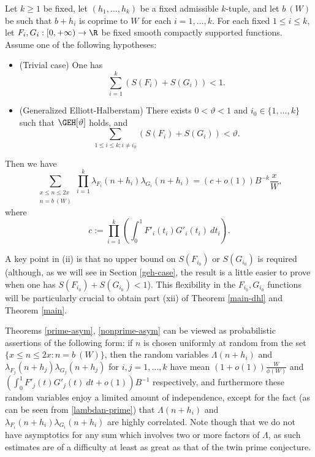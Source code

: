 \begin{theorem}\label{nonprime-asym}  Let $k \geq 1$ be fixed, let $(h_1,\dots,h_k)$ be a fixed admissible $k$-tuple, and let $b\ (W)$ be such that $b+h_i$ is coprime to $W$ for each $i=1,\dots,k$.  For each fixed $1 \leq i \leq k$, let $F_{i}, G_{i}: [0,+\infty) \to \R$ be fixed smooth compactly supported functions.  Assume one of the following hypotheses:
\begin{itemize}
\item[(i)]  (Trivial case)  One has
\begin{equation}\label{easy-upper}
\sum_{i=1}^k ( S(F_i) + S(G_i) ) < 1.
\end{equation}
\item[(ii)]  (Generalized Elliott-Halberstam) There exists $0 < \vartheta < 1$ and $i_0 \in \{1,\dots,k\}$ such that $\GEH[\vartheta]$ holds, and
\begin{equation}\label{eh-upper}
\sum_{1 \leq i \leq k; i \neq i_0} ( S(F_{i}) + S(G_{i}) ) < \vartheta.
\end{equation}
\end{itemize}
Then we have
\begin{equation}\label{lflg}
 \sum_{\substack{x \leq n \leq 2x\\ n = b\ (W)}} \prod_{i=1}^k \lambda_{F_{i}}(n+h_{i}) \lambda_{G_{i}}(n+h_{i}) = 
(c+o(1)) B^{-k} \frac{x}{W},
\end{equation}
where
\begin{equation}\label{c-def}
 c := \prod_{i=1}^k \left(\int_0^1 F'_i(t_i) G'_i(t_i)\ dt_i\right).
\end{equation}
\end{theorem}

A key point in (ii) is that no upper bound on $S(F_{i_0})$ or $S(G_{i_0})$ is required (although, as we will see in Section \ref{geh-case}, the result is a little easier to prove when one has $S(F_{i_0})+S(G_{i_0}) < 1$).  This flexibility in the $F_{i_0}, G_{i_0}$ functions will be particularly crucial to obtain part (xii) of Theorem \ref{main-dhl} and Theorem \ref{main}.

\begin{remark}  Theorems \ref{prime-asym}, \ref{nonprime-asym} can be viewed as probabilistic assertions of the following form: if $n$ is chosen uniformly at random from the set $\{ x \leq n \leq 2x: n = b\ (W)\}$, then the random variables $\Lambda(n+h_i)$ and $\lambda_{F_j}(n+h_j) \lambda_{G_j}(n+h_j)$ for $i,j=1,\dots,k$ have mean $(1+o(1)) \frac{W}{\phi(W)}$ and $(\int_0^1 F'_j(t) G'_j(t)\ dt + o(1)) B^{-1}$ respectively, and furthermore these random variables enjoy a limited amount of independence, except for the fact (as can be seen from \eqref{lambdan-prime}) that $\Lambda(n+h_i)$ and $\lambda_{F_i}(n+h_i) \lambda_{G_i}(n+h_i)$ are highly correlated.  Note though that we do not have asymptotics for any sum which involves two or more factors of $\Lambda$, as such estimates are of a difficulty at least as great as that of the twin prime conjecture.
\end{remark}



